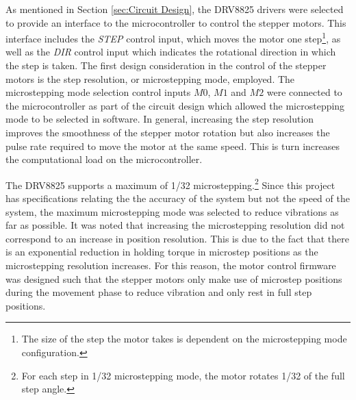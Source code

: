 %


As mentioned in Section \ref{sec:Circuit Design}, the DRV8825 drivers were selected to provide an interface to the microcontroller to control the stepper motors. This interface includes the \textit{STEP} control input, which moves the motor one step\footnote{The size of the step the motor takes is dependent on the microstepping mode configuration.}, as well as the \textit{DIR} control input which indicates the rotational direction in which the step is taken. The first design consideration in the control of the stepper motors is the step resolution, or microstepping mode, employed. The microstepping mode selection control inputs $M0$, $M1$ and $M2$ were connected to the microcontroller as part of the circuit design which allowed the microstepping mode to be selected in software. In general, increasing the step resolution improves the smoothness of the stepper motor rotation but also increases the pulse rate required to move the motor at the same speed. This is turn increases the computational load on the microcontroller.

The DRV8825 supports a maximum of 1/32 microstepping.\footnote{For each step in 1/32 microstepping mode, the motor rotates 1/32 of the full step angle.} Since this project has specifications relating the the accuracy of the system but not the speed of the system, the maximum microstepping mode was selected to reduce vibrations as far as possible. It was noted that increasing the microstepping resolution did not correspond to an increase in position resolution. This is due to the fact that there is an exponential reduction in holding torque in microstep positions as the microstepping resolution increases. For this reason, the motor control firmware was designed such that the stepper motors only make use of microstep positions during the movement phase to reduce vibration and only rest in full step positions.

